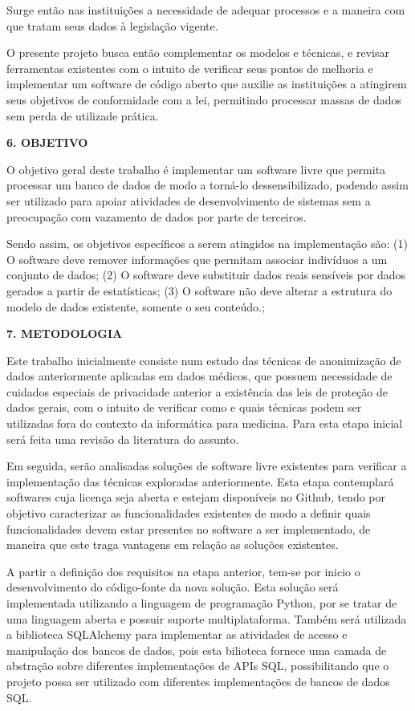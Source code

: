 \documentclass[a4paper,12pt,oneside,openany]{report}
\begin{document}
Surge então nas instituições a necessidade de adequar processos e a maneira com que tratam seus dados à legislação vigente.

O presente projeto busca então complementar os modelos e técnicas, e revisar ferramentas existentes com o intuito de verificar seus pontos de melhoria e implementar um software de código aberto que auxilie as instituições a atingirem seus objetivos de conformidade com a lei, permitindo processar massas de dados sem perda de utilizade prática.

\vspace{0.4cm}
\textbf{6. OBJETIVO}

O objetivo geral deste trabalho é implementar um software livre que permita processar um banco de dados de modo a torná-lo dessensibilizado, podendo assim ser utilizado para apoiar atividades de desenvolvimento de sistemas sem a preocupação com vazamento de dados por parte de terceiros.

Sendo assim, os objetivos específicos a serem atingidos na implementação são: (1) O software deve remover informações que permitam associar indivíduos a um conjunto de dados; (2) O software deve substituir dados reais sensíveis por dados gerados a partir de estatísticas; (3) O software não deve alterar a estrutura do modelo de dados existente, somente o seu conteúdo.;

\vspace{0.4cm}
\textbf{7. METODOLOGIA}

Este trabalho inicialmente consiste num estudo das técnicas de anonimização de dados anteriormente aplicadas em dados médicos, que possuem necessidade de cuidados especiais de privacidade anterior a existência das leis de proteção de dados gerais, com o intuito de verificar como e quais técnicas podem ser utilizadas fora do contexto da informática para medicina. Para esta etapa inicial será feita uma revisão da literatura do assunto.

Em seguida, serão analisadas soluções de software livre existentes para verificar a implementação das técnicas exploradas anteriormente. Esta etapa contemplará softwares cuja licença seja aberta e estejam disponíveis no Github, tendo por objetivo caracterizar as funcionalidades existentes de modo a definir quais funcionalidades devem estar presentes no software a ser implementado, de maneira que este traga vantagens em relação as soluções existentes.

A partir a definição dos requisitos na etapa anterior, tem-se por inicio o desenvolvimento do código-fonte da nova solução. Esta solução será implementada utilizando a linguagem de programação Python, por se tratar de uma linguagem aberta e possuir suporte multiplataforma. Também será utilizada a biblioteca SQLAlchemy para implementar as atividades de acesso e manipulação dos bancos de dados, pois esta bilioteca fornece uma camada de abstração sobre diferentes implementações de APIs SQL\cite{sqlalch}, possibilitando que o projeto possa ser utilizado com diferentes implementações de bancos de dados SQL.
\end{document}
